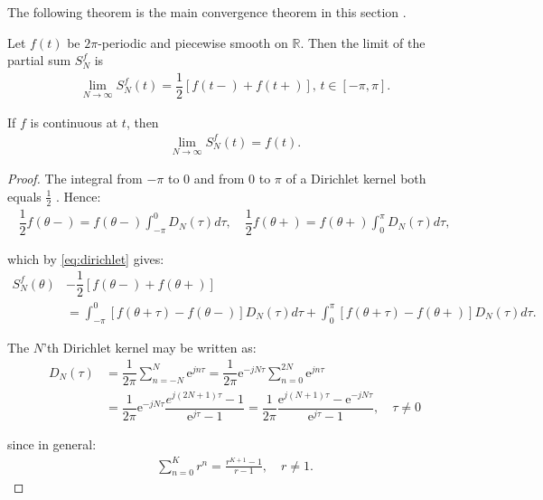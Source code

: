 The following theorem is the main convergence theorem in this section \cite{page 35, FAA}.

\begin{theorem} \label{theo:main_convergence}
Let $f(t)$ be $2\pi$-periodic and piecewise smooth on $\mathbb{R}$. Then the limit of the partial sum $S_N^f$ is
	\begin{align*}
		\lim_{N\to\infty} S_N^f (t) = \dfrac{1}{2}\left[f(t-) + 		f(t+)\right], \, t \in [-\pi, \pi].
	\end{align*}

If $f$ is continuous at $t$, then
	\begin{align*}
		\lim_{N\to \infty} S_N^f(t) = f(t).
	\end{align*}
\end{theorem}

\begin{proof}
The integral from $-\pi$ to $0$ and from $0$ to $\pi$ of a Dirichlet kernel both equals $\frac{1}{2}$ \cite{page 35, FAA}. Hence:
	\begin{align*}
		\dfrac{1}{2} f(\theta-) = f(\theta-) \int_{-\pi}^0 				D_N(\tau)d\tau, \quad \dfrac{1}{2}f(\theta+) = 					f(\theta+) \int_0^\pi D_N (\tau)d\tau,
	\end{align*}
	
	which by \eqref{eq:dirichlet} gives:
	\begin{align} \label{eq:S_N_proof}
		S_N^f(\theta) &- \dfrac{1}{2}\left[f(\theta-) + 				f(\theta+)\right] \nonumber \\
		&= \int_{-\pi}^0 \left[f(\theta + \tau) - f(\theta-) 			\right] D_N(\tau) d\tau + \int_0^\pi \left[f(\theta + 			\tau) - f(\theta+) \right] D_N(\tau) d\tau.
	\end{align}
	
	The $N$'th Dirichlet kernel may be written as:
	\begin{align} \label{eq:Dirichlet_proof}
		D_N(\tau) &= \dfrac{1}{2\pi}\sum_{n=-N}^{N}\text{e}^{j 			n \tau} = \dfrac{1}{2\pi} \text{e}^{-jN\tau} \sum_{n=0}			^{2N} \text{e}^{jn \tau} \nonumber \\
		&= \dfrac{1}{2\pi} \text{e}^{-jN\tau} \dfrac{e^{j(2N+1)			\tau}-1}{\text{e}^{j\tau}-1} = \dfrac{1}{2\pi} 					\dfrac{\text{e}^{j(N+1)\tau}-\text{e}^{-jN\tau}}				{\text{e}^{j\tau}-1}, \quad \tau \neq 0
	\end{align}
	
	since in general:
	\begin{align*}
		\sum_{n=0}^K r^n = \frac{r^{K+1}-1}{r-1}, \quad r \neq 			1.
	\end{align*}
	

\end{proof}
